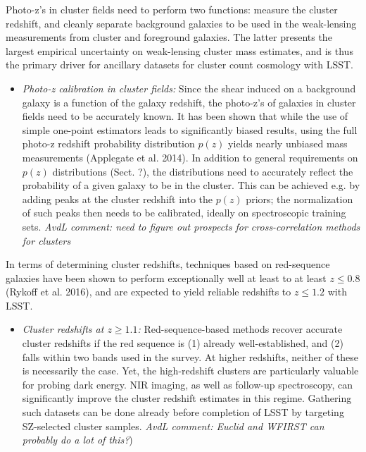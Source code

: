 Photo-z's in cluster fields need to perform two functions: measure the cluster redshift, and cleanly separate background galaxies to be used in the weak-lensing measurements from cluster and foreground galaxies.  The latter presents the largest empirical uncertainty on weak-lensing cluster mass estimates, and is thus the primary driver for ancillary datasets for cluster count cosmology with LSST. 

\begin{itemize}
\item {\it Photo-z calibration in cluster fields:} Since the shear induced on a background galaxy is a function of the galaxy redshift, the photo-z's of galaxies in cluster fields need to be accurately known.  It has been shown that while the use of simple one-point estimators leads to significantly biased results, using the full photo-z redshift probability distribution $p(z)$ yields nearly unbiased mass measurements (Applegate et al. 2014).  In addition to general requirements on $p(z)$ distributions (Sect. ?), the distributions need to accurately reflect the probability of a given galaxy to be in the cluster.  This can be achieved e.g. by adding peaks at the cluster redshift into the $p(z)$ priors; the normalization of such peaks then needs to be calibrated, ideally on spectroscopic training sets. {\it AvdL comment: need to figure out prospects for cross-correlation methods for clusters}
\end{itemize}


In terms of determining cluster redshifts, techniques based on red-sequence galaxies have been shown to perform exceptionally well at least to at least $z\le0.8$ (Rykoff et al. 2016), and are expected to yield reliable redshifts to $z\le1.2$ with LSST. 
\begin{itemize}
\item {\it Cluster redshifts at $z\ge1.1$:} Red-sequence-based methods recover accurate cluster redshifts if the red sequence is (1) already well-established, and (2) falls within two bands used in the survey. At higher redshifts, neither of these is necessarily the case.  Yet, the high-redshift clusters are particularly valuable for probing dark energy.  NIR imaging, as well as follow-up spectroscopy, can significantly improve the cluster redshift estimates in this regime.  Gathering such datasets can be done already before completion of LSST by targeting SZ-selected cluster samples.  {\it AvdL comment: Euclid and WFIRST can probably do a lot of this?})
\end{itemize}


